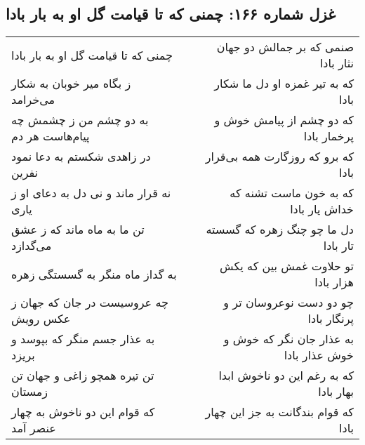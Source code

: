 \begin{center}
\section*{غزل شماره ۱۶۶: چمنی که تا قیامت گل او به بار بادا}
\label{sec:0166}
\begin{longtable}{l p{0.5cm} r}
چمنی که تا قیامت گل او به بار بادا
&&
صنمی که بر جمالش دو جهان نثار بادا
\\
ز بگاه میر خوبان به شکار می‌خرامد
&&
که به تیر غمزه او دل ما شکار بادا
\\
به دو چشم من ز چشمش چه پیام‌هاست هر دم
&&
که دو چشم از پیامش خوش و پرخمار بادا
\\
در زاهدی شکستم به دعا نمود نفرین
&&
که برو که روزگارت همه بی‌قرار بادا
\\
نه قرار ماند و نی دل به دعای او ز یاری
&&
که به خون ماست تشنه که خداش یار بادا
\\
تن ما به ماه ماند که ز عشق می‌گدازد
&&
دل ما چو چنگ زهره که گسسته تار بادا
\\
به گداز ماه منگر به گسستگی زهره
&&
تو حلاوت غمش بین که یکش هزار بادا
\\
چه عروسیست در جان که جهان ز عکس رویش
&&
چو دو دست نوعروسان تر و پرنگار بادا
\\
به عذار جسم منگر که بپوسد و بریزد
&&
به عذار جان نگر که خوش و خوش عذار بادا
\\
تن تیره همچو زاغی و جهان تن زمستان
&&
که به رغم این دو ناخوش ابدا بهار بادا
\\
که قوام این دو ناخوش به چهار عنصر آمد
&&
که قوام بندگانت به جز این چهار بادا
\\
\end{longtable}
\end{center}
